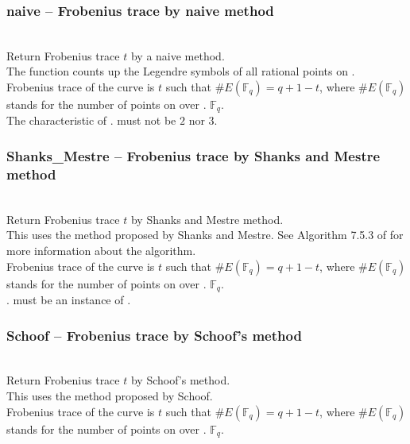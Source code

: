   \subsubsection{naive -- Frobenius trace by naive method}
   \\
   \spacing
   \quad Return Frobenius trace $t$ by a naive method.\\
   \spacing
   \quad \negok The function counts up the Legendre symbols of all rational points on .\\
   Frobenius trace of the curve is $t$ such that $\#E(\mathbb{F}_q)=q+1-t$, where $\#E(\mathbb{F}_q)$ stands for the number of points on  over . $\mathbb{F}_q$. \\
   \spacing
   \quad The characteristic of . must not be $2$ nor $3$.\\
%
  \subsubsection{Shanks\_Mestre -- Frobenius trace by Shanks and Mestre method}
   \\
   \spacing
   \quad Return Frobenius trace $t$ by Shanks and Mestre method.\\
   \spacing
   \quad \negok This uses the method proposed by Shanks and Mestre.
   \negok See Algorithm 7.5.3 of \cite{Pomerance} for more information about the algorithm.\\
   Frobenius trace of the curve is $t$ such that $\#E(\mathbb{F}_q)=q+1-t$, where $\#E(\mathbb{F}_q)$ stands for the number of points on  over . $\mathbb{F}_q$. \\
   \spacing
   \quad {}. must be an instance of .\\
%
  \subsubsection{Schoof -- Frobenius trace by Schoof's method}
   \\
   \spacing
   \quad Return Frobenius trace $t$ by Schoof's method.\\
   \spacing
   \quad \negok This uses the method proposed by Schoof.\\
   Frobenius trace of the curve is $t$ such that $\#E(\mathbb{F}_q)=q+1-t$, where $\#E(\mathbb{F}_q)$ stands for the number of points on  over . $\mathbb{F}_q$. \\
   \spacing
%
